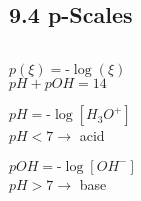 \subsection{9.4 p-Scales}
    \begin{center}
        \begin{tabular}{c c c}

        \end{tabular}
        \begin{minipage}{0.99\linewidth}
            \begin{minipage}{0.31\linewidth}
                \center
                $p(\xi) = \mbox{-}\log(\xi)$\\
                $pH + pOH = 14$
            \end{minipage}
            \begin{minipage}{0.34\linewidth}
                \center
                $pH = \mbox{-}\log[H_3O^+]$\\
                $pH < 7 \rightarrow$ acid
            \end{minipage}
            \begin{minipage}{0.33\linewidth}
                \center
                $pOH = \mbox{-}\log[OH^-]$\\
                $pH > 7 \rightarrow$ base
            \end{minipage}
        \end{minipage}
    \end{center}